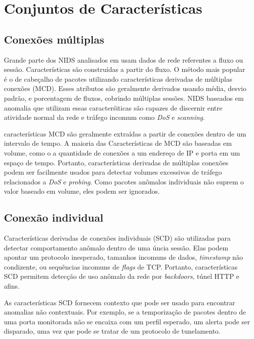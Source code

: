 
\section{Conjuntos de Características}
\subsection{Conexões múltiplas}
Grande parte dos NIDS analisados em \cite{davis11} usam dados de rede referentes a fluxo ou sessão. Características
são construídas a partir do fluxo. O método mais popular é o de cabeçalho de pacotes utilizando características
derivadas de múltiplas conexões (MCD). Esses atributos são geralmente derivados usando média, desvio padrão, e
porcentagem de fluxos, cobrindo múltiplas sessões. NIDS baseados em anomalia que utilizam essas caracterśiticas são
capazes de discernir entre atividade normal da rede e tráfego incomum como \textit{DoS} e \textit{scanning}.
\par características MCD são geralmente extraídas a partir de conexões dentro de um intervalo de tempo. A maioria das
 Características de MCD são baseadas em volume, como o a quantidade de conexões a um endereço de IP e porta
 em um espaço de tempo. Portanto, características derivadas de múltiplas conexões podem ser facilmente usados para detectar
 volumes excessivos de tráfego relacionados a \textit{DoS} e \textit{probing}. Como pacotes anômalos individuais não
 suprem o valor baseado em volume, eles podem ser ignorados.

\subsection{Conexão individual}
Características derivadas de conexões individuais (SCD) são utilizadas para detectar comportamento anômalo dentro de
uma úncia sessão. Elas podem apontar um protocolo inesperado, tamanhos incomuns de dados, \emph{timestamp} não condizente,
ou sequências incomuns de \textit{flags} de TCP. Portanto, características SCD permitem detecção de uso anômalo da rede
por \textit{backdoors}, túnel HTTP e afins.
\par As características SCD fornecem contexto que pode ser usado para encontrar anomalias não contextuais. Por exemplo, se a
temporização de pacotes dentro de uma porta monitorada não se encaixa com um perfil esperado, um alerta pode ser
disparado, uma vez que pode se tratar de um protocolo de tunelamento.


